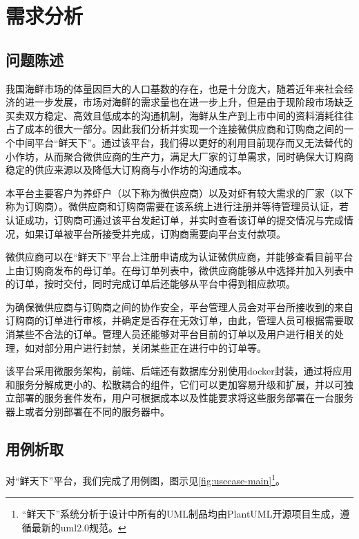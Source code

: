 \chapter{需求分析}

\label{cha:demand_analysis}
\section{问题陈述}


我国海鲜市场的体量因巨大的人口基数的存在，也是十分庞大，随着近年来社会经济的进一步发展，市场对海鲜的需求量也在进一步上升，但是由于现阶段市场缺乏买卖双方稳定、高效且低成本的沟通机制，海鲜从生产到上市中间的资料消耗往往占了成本的很大一部分。因此我们分析并实现一个连接微供应商和订购商之间的一个中间平台“鲜天下”。通过该平台，我们得以更好的利用目前现存而又无法替代的小作坊，从而聚合微供应商的生产力，满足大厂家的订单需求，同时确保大订购商稳定的供应来源以及降低大订购商与小作坊的沟通成本。

本平台主要客户为养虾户（以下称为微供应商）以及对虾有较大需求的厂家（以下称为订购商）。微供应商和订购商需要在该系统上进行注册并等待管理员认证，若认证成功，订购商可通过该平台发起订单，并实时查看该订单的提交情况与完成情况，如果订单被平台所接受并完成，订购商需要向平台支付款项。

微供应商可以在“鲜天下”平台上注册申请成为认证微供应商，并能够查看目前平台上由订购商发布的母订单。在母订单列表中，微供应商能够从中选择并加入列表中的订单，按时交付，同时完成订单后还能够从平台中得到相应款项。


为确保微供应商与订购商之间的协作安全，平台管理人员会对平台所接收到的来自订购商的订单进行审核，并确定是否存在无效订单，由此，管理人员可根据需要取消某些不合法的订单。管理人员还能够对平台目前的订单以及用户进行相关的处理，如对部分用户进行封禁，关闭某些正在进行中的订单等。


该平台采用微服务架构，前端、后端还有数据库分别使用docker封装，通过将应用和服务分解成更小的、松散耦合的组件，它们可以更加容易升级和扩展，并以可独立部署的服务套件发布，用户可根据成本以及性能要求将这些服务部署在一台服务器上或者分别部署在不同的服务器中。


\section{用例析取}

对“鲜天下”平台，我们完成了用例图，图示见\autoref{fig:usecase-main}\footnote{“鲜天下”系统分析于设计中所有的UML制品均由PlantUML开源项目生成，遵循最新的uml2.0规范。}。


